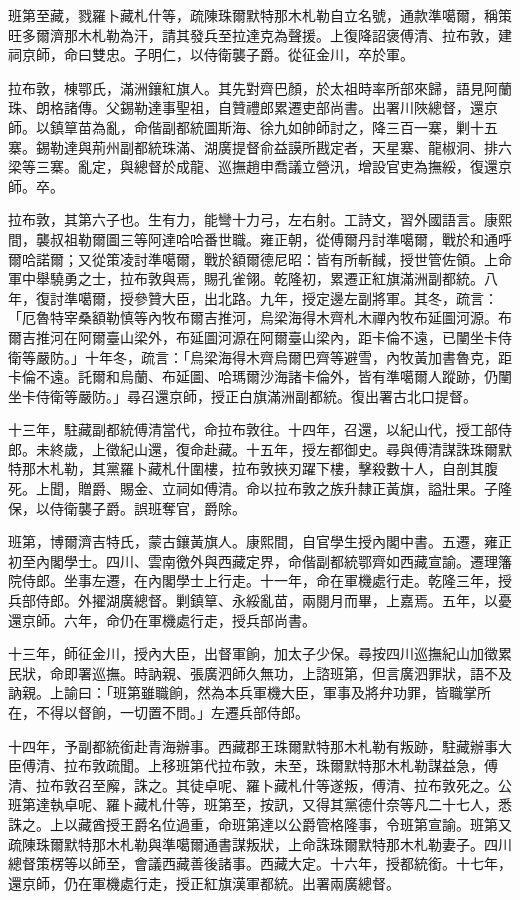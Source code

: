 \begin{pinyinscope}
班第至藏，戮羅卜藏札什等，疏陳珠爾默特那木札勒自立名號，通款準噶爾，稱策旺多爾濟那木札勒為汗，請其發兵至拉達克為聲援。上復降詔褒傅清、拉布敦，建祠京師，命曰雙忠。子明仁，以侍衛襲子爵。從征金川，卒於軍。

拉布敦，棟鄂氏，滿洲鑲紅旗人。其先對齊巴顏，於太祖時率所部來歸，語見阿蘭珠、朗格諸傳。父錫勒達事聖祖，自贊禮郎累遷吏部尚書。出署川陜總督，還京師。以鎮筸苗為亂，命偕副都統圖斯海、徐九如帥師討之，降三百一寨，剿十五寨。錫勒達與荊州副都統珠滿、湖廣提督俞益謨所戡定者，天星寨、龍椒洞、排六梁等三寨。亂定，與總督於成龍、巡撫趙申喬議立營汛，增設官吏為撫綏，復還京師。卒。

拉布敦，其第六子也。生有力，能彎十力弓，左右射。工詩文，習外國語言。康熙間，襲叔祖勒爾圖三等阿達哈哈番世職。雍正朝，從傅爾丹討準噶爾，戰於和通呼爾哈諾爾；又從策凌討準噶爾，戰於額爾德尼昭：皆有所斬馘，授世管佐領。上命軍中舉驍勇之士，拉布敦與焉，賜孔雀翎。乾隆初，累遷正紅旗滿洲副都統。八年，復討準噶爾，授參贊大臣，出北路。九年，授定邊左副將軍。其冬，疏言：「厄魯特宰桑額勒慎等內牧布爾吉推河，烏梁海得木齊札木禪內牧布延圖河源。布爾吉推河在阿爾臺山梁外，布延圖河源在阿爾臺山梁內，距卡倫不遠，已闉坐卡侍衛等嚴防。」十年冬，疏言：「烏梁海得木齊烏爾巴齊等避雪，內牧黃加書魯克，距卡倫不遠。託爾和烏蘭、布延圖、哈瑪爾沙海諸卡倫外，皆有準噶爾人蹤跡，仍闉坐卡侍衛等嚴防。」尋召還京師，授正白旗滿洲副都統。復出署古北口提督。

十三年，駐藏副都統傅清當代，命拉布敦往。十四年，召還，以紀山代，授工部侍郎。未終歲，上徵紀山還，復命赴藏。十五年，授左都御史。尋與傅清謀誅珠爾默特那木札勒，其黨羅卜藏札什圍樓，拉布敦挾刃躍下樓，擊殺數十人，自剖其腹死。上聞，贈爵、賜金、立祠如傅清。命以拉布敦之族升隸正黃旗，謚壯果。子隆保，以侍衛襲子爵。誤班奪官，爵除。

班第，博爾濟吉特氏，蒙古鑲黃旗人。康熙間，自官學生授內閣中書。五遷，雍正初至內閣學士。四川、雲南徼外與西藏定界，命偕副都統鄂齊如西藏宣諭。遷理籓院侍郎。坐事左遷，在內閣學士上行走。十一年，命在軍機處行走。乾隆三年，授兵部侍郎。外擢湖廣總督。剿鎮筸、永綏亂苗，兩閱月而畢，上嘉焉。五年，以憂還京師。六年，命仍在軍機處行走，授兵部尚書。

十三年，師征金川，授內大臣，出督軍餉，加太子少保。尋按四川巡撫紀山加徵累民狀，命即署巡撫。時訥親、張廣泗師久無功，上諮班第，但言廣泗罪狀，語不及訥親。上諭曰：「班第雖職餉，然為本兵軍機大臣，軍事及將弁功罪，皆職掌所在，不得以督餉，一切置不問。」左遷兵部侍郎。

十四年，予副都統銜赴青海辦事。西藏郡王珠爾默特那木札勒有叛跡，駐藏辦事大臣傅清、拉布敦疏聞。上移班第代拉布敦，未至，珠爾默特那木札勒謀益急，傅清、拉布敦召至廨，誅之。其徒卓呢、羅卜藏札什等遂叛，傅清、拉布敦死之。公班第達執卓呢、羅卜藏札什等，班第至，按訊，又得其黨德什奈等凡二十七人，悉誅之。上以藏酋授王爵名位過重，命班第達以公爵管格隆事，令班第宣諭。班第又疏陳珠爾默特那木札勒與準噶爾通書謀叛狀，上命誅珠爾默特那木札勒妻子。四川總督策楞等以師至，會議西藏善後諸事。西藏大定。十六年，授都統銜。十七年，還京師，仍在軍機處行走，授正紅旗漢軍都統。出署兩廣總督。


\end{pinyinscope}
